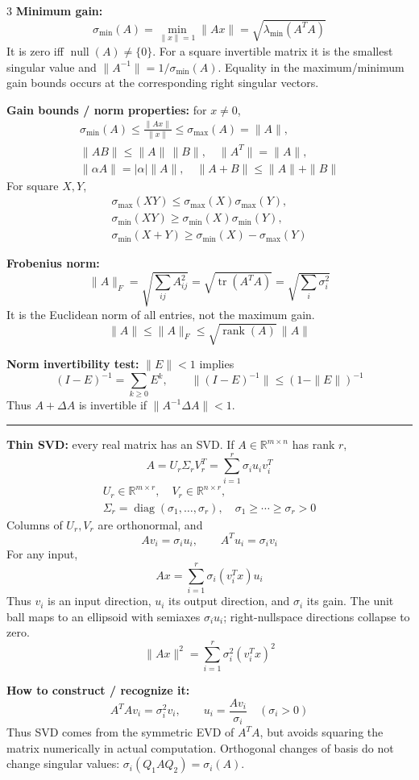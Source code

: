 \documentclass[10pt]{article}
\newcommand{\sect}[1]{\vspace{0.9pt}{\fontsize{7.2}{7.5}\selectfont\textbf{#1}}\vspace{0.25pt}\hrule\vspace{0.8pt}}
\newcommand{\sub}[1]{\textbf{#1}}
\newcommand{\R}{\mathbb{R}}
\newcommand{\rank}{\operatorname{rank}}
\newcommand{\nullsp}{\operatorname{null}}
\newcommand{\diag}{\operatorname{diag}}
\newcommand{\tr}{\operatorname{tr}}
\begin{document}
\begin{multicols*}{3}
\sub{Minimum gain:}
\[
\sigma_{\min}(A)=\min_{\|x\|=1}\|Ax\|
=\sqrt{\lambda_{\min}(A^TA)}
\]
It is zero iff \(\nullsp(A)\ne\{0\}\). For a square invertible matrix it
is the smallest singular value and
\(\|A^{-1}\|=1/\sigma_{\min}(A)\).
Equality in the maximum/minimum gain bounds occurs at the corresponding
right singular vectors.

\sub{Gain bounds / norm properties:} for \(x\ne0\),
\[
\begin{gathered}
\sigma_{\min}(A)\le\frac{\|Ax\|}{\|x\|}
\le\sigma_{\max}(A)=\|A\|,\\
\|AB\|\le\|A\|\,\|B\|,\quad \|A^T\|=\|A\|,\\
\|\alpha A\|=|\alpha|\|A\|,\quad
\|A+B\|\le\|A\|+\|B\|
\end{gathered}
\]
For square \(X,Y\),
\[
\begin{gathered}
\sigma_{\max}(XY)\le\sigma_{\max}(X)\sigma_{\max}(Y),\\
\sigma_{\min}(XY)\ge\sigma_{\min}(X)\sigma_{\min}(Y),\\
\sigma_{\min}(X+Y)\ge\sigma_{\min}(X)-\sigma_{\max}(Y)
\end{gathered}
\]

\sub{Frobenius norm:}
\[
\|A\|_F=\sqrt{\sum_{ij}A_{ij}^2}
=\sqrt{\tr(A^TA)}
=\sqrt{\sum_i\sigma_i^2}
\]
It is the Euclidean norm of all entries, not the maximum gain.
\[
\|A\|\le\|A\|_F\le\sqrt{\rank(A)}\,\|A\|
\]

\sub{Norm invertibility test:} \(\|E\|<1\) implies
\[
(I-E)^{-1}=\sum_{k\ge0}E^k,\qquad
\|(I-E)^{-1}\|\le(1-\|E\|)^{-1}
\]
Thus \(A+\Delta A\) is invertible if \(\|A^{-1}\Delta A\|<1\).

\sect{SVD (Lecture 17)}
\sub{Thin SVD:} every real matrix has an SVD. If
\(A\in\R^{m\times n}\) has rank \(r\),
\[
A=U_r\Sigma_rV_r^T=\sum_{i=1}^r\sigma_i u_iv_i^T
\]
\[
\begin{gathered}
U_r\in\R^{m\times r},\quad V_r\in\R^{n\times r},\\
\Sigma_r=\diag(\sigma_1,\ldots,\sigma_r),\quad
\sigma_1\ge\cdots\ge\sigma_r>0
\end{gathered}
\]
Columns of \(U_r,V_r\) are orthonormal, and
\[
Av_i=\sigma_i u_i,\qquad A^Tu_i=\sigma_i v_i
\]
For any input,
\[
Ax=\sum_{i=1}^r\sigma_i(v_i^Tx)u_i
\]
Thus \(v_i\) is an input direction, \(u_i\) its output direction, and
\(\sigma_i\) its gain. The unit ball maps to an ellipsoid with semiaxes
\(\sigma_i u_i\); right-nullspace directions collapse to zero.
\[
\|Ax\|^2=\sum_{i=1}^r\sigma_i^2(v_i^Tx)^2
\]

\sub{How to construct / recognize it:}
\[
A^TAv_i=\sigma_i^2v_i,\qquad
u_i=\frac{Av_i}{\sigma_i}\quad(\sigma_i>0)
\]
Thus SVD comes from the symmetric EVD of \(A^TA\), but avoids squaring
the matrix numerically in actual computation. Orthogonal changes of
basis do not change singular values:
\(\sigma_i(Q_1AQ_2)=\sigma_i(A)\).


\end{multicols*}
\end{document}
